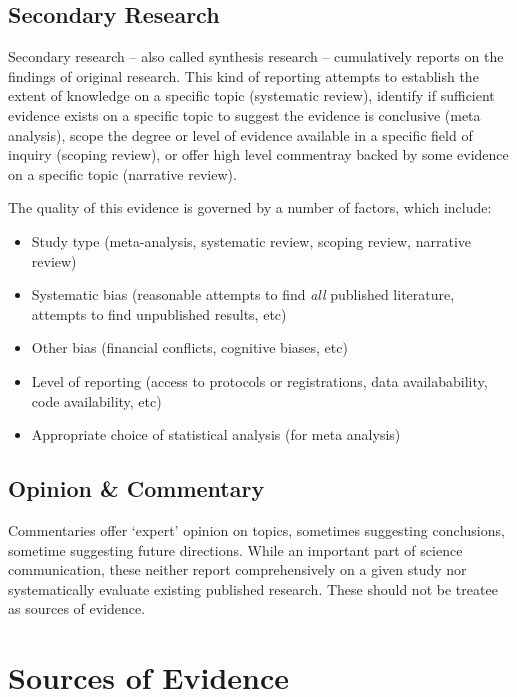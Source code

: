 \documentclass[
]{book}
\providecommand{\tightlist}{%
  \setlength{\itemsep}{0pt}\setlength{\parskip}{0pt}}
\begin{document}
\hypertarget{secondary-research}{%
\subsection{Secondary Research}\label{secondary-research}}

Secondary research -- also called synthesis research -- cumulatively reports on the findings of original research. This kind of reporting attempts to establish the extent of knowledge on a specific topic (systematic review), identify if sufficient evidence exists on a specific topic to suggest the evidence is conclusive (meta analysis), scope the degree or level of evidence available in a specific field of inquiry (scoping review), or offer high level commentray backed by some evidence on a specific topic (narrative review).

The quality of this evidence is governed by a number of factors, which include:

\begin{itemize}
\tightlist
\item
  Study type (meta-analysis, systematic review, scoping review, narrative review)
\item
  Systematic bias (reasonable attempts to find \emph{all} published literature, attempts to find unpublished results, etc)
\item
  Other bias (financial conflicts, cognitive biases, etc)
\item
  Level of reporting (access to protocols or registrations, data availabability, code availability, etc)
\item
  Appropriate choice of statistical analysis (for meta analysis)
\end{itemize}

\hypertarget{opinion-commentary}{%
\subsection{Opinion \& Commentary}\label{opinion-commentary}}

Commentaries offer `expert' opinion on topics, sometimes suggesting conclusions, sometime suggesting future directions. While an important part of science communication, these neither report comprehensively on a given study nor systematically evaluate existing published research. These should not be treatee as sources of evidence.

\hypertarget{sources-of-evidence}{%
\section{Sources of Evidence}\label{sources-of-evidence}}
\end{document}
